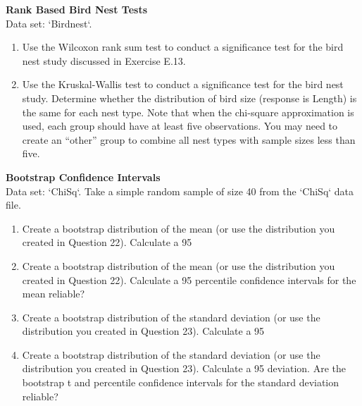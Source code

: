 \documentclass[
]{report}
\begin{document}
\begin{list}{E.}{ \setlength{\itemsep}{0.5em}}
  
  
  
  \item \textbf{Rank Based Bird Nest Tests} \\
  Data set: `Birdnest`. 
  \begin{enumerate}
    \setcounter{enumi}{0}  
    \item Use the Wilcoxon rank sum test to conduct a significance test for the bird nest study discussed in
Exercise E.13.
    \item Use the Kruskal-Wallis test to conduct a significance test for the bird nest study. Determine
whether the distribution of bird size (response is Length) is the same for each nest type. Note
that when the chi-square approximation is used, each group should have at least five observations.
You may need to create an “other” group to combine all nest types with sample sizes less
than five.
  \end{enumerate}
  
  
  
  
  \item \textbf{Bootstrap Confidence Intervals} \\
  Data set: `ChiSq`. Take a simple random sample of size 40 from the `ChiSq` data file.
  \begin{enumerate}
    \setcounter{enumi}{0}  
    \item Create a bootstrap distribution of the mean (or use the distribution you created in Question 22).
Calculate a 95%
    \item Create a bootstrap distribution of the mean (or use the distribution you created in Question 22).
Calculate a 95%
percentile confidence intervals for the mean reliable?
    \item Create a bootstrap distribution of the standard deviation (or use the distribution you created in
Question 23). Calculate a 95%
    \item Create a bootstrap distribution of the standard deviation (or use the distribution you created
in Question 23). Calculate a 95%
deviation. Are the bootstrap t and percentile confidence intervals for the standard deviation
reliable?
  \end{enumerate}
  
  
  
  
  

\end{list}
\end{document}
